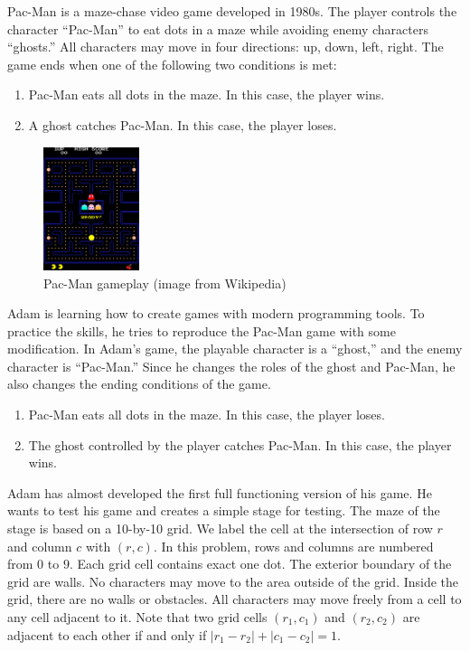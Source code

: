 Pac-Man is a maze-chase video game developed in 1980s. 
The player controls the character ``Pac-Man'' to eat dots in a maze while
avoiding enemy characters ``ghosts.'' 
All characters may move in four directions: up, down, left, right.
The game ends when one of the following two conditions is met:
\begin{enumerate}
\tightlist
\item Pac-Man eats all dots in the maze. In this case, the player wins.
\item A ghost catches Pac-Man. In this case, the player loses.
\end{enumerate}

\begin{figure}[h]
\center
\includegraphics[width=0.25\textwidth]{image/pacman.png}
\caption{Pac-Man gameplay (image from Wikipedia)}
\end{figure}

Adam is learning how to create games with modern programming tools.
To practice the skills, he tries to reproduce the Pac-Man 
game with some modification.
In Adam's game, the playable character is a ``ghost,'' 
and the enemy character is ``Pac-Man.'' 
Since he changes the roles of the ghost and Pac-Man, 
he also changes the ending conditions of the game.
\begin{enumerate}
\tightlist
\item Pac-Man eats all dots in the maze. In this case, the player loses.
\item The ghost controlled by the player catches Pac-Man. In this case, the player wins.
\end{enumerate}

Adam has almost developed the first full functioning version of his game.
He wants to test his game and creates a simple stage for testing.
The maze of the stage is based on a 10-by-10 grid. 
We label the cell at the intersection of row $r$ and column $c$ with 
$(r,c)$. In this problem, rows and columns are numbered from $0$ to $9$.
Each grid cell contains exact one dot.
The exterior boundary of the grid are walls. 
No characters may move to the area outside of the grid.
Inside the grid, there are no walls or obstacles.
All characters may move freely from a cell to any cell adjacent to it.
Note that two grid cells $(r_1,c_1)$ and $(r_2,c_2)$ are adjacent to each other 
if and only if $|r_1-r_2|+|c_1-c_2|=1$.
 

